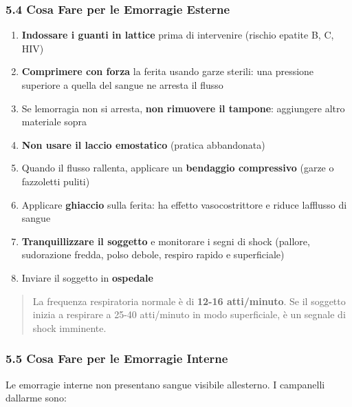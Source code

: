 \documentclass[a4paper,11pt]{article}
\providecommand{\tightlist}{%
  \setlength{\itemsep}{0pt}\setlength{\parskip}{0pt}}
\begin{document}
\subsubsection{5.4 Cosa Fare per le Emorragie
      Esterne}\label{cosa-fare-per-le-emorragie-esterne}

\begin{enumerate}
      \tightlist
      \item
            \textbf{Indossare i guanti in lattice} prima di intervenire (rischio
            epatite B, C, HIV)
      \item
            \textbf{Comprimere con forza} la ferita usando garze sterili: una
            pressione superiore a quella del sangue ne arresta il flusso
      \item
            Se l\textquotesingle emorragia non si arresta, \textbf{non rimuovere
                  il tampone}: aggiungere altro materiale sopra
      \item
            \textbf{Non usare il laccio emostatico} (pratica abbandonata)
      \item
            Quando il flusso rallenta, applicare un \textbf{bendaggio compressivo}
            (garze o fazzoletti puliti)
      \item
            Applicare \textbf{ghiaccio} sulla ferita: ha effetto vasocostrittore e
            riduce l\textquotesingle afflusso di sangue
      \item
            \textbf{Tranquillizzare il soggetto} e monitorare i segni di shock
            (pallore, sudorazione fredda, polso debole, respiro rapido e
            superficiale)
      \item
            Inviare il soggetto in \textbf{ospedale}
\end{enumerate}

\begin{quote}
      La frequenza respiratoria normale è di \textbf{12-16 atti/minuto}. Se il
      soggetto inizia a respirare a 25-40 atti/minuto in modo superficiale, è
      un segnale di shock imminente.
\end{quote}

\subsubsection{5.5 Cosa Fare per le Emorragie
      Interne}\label{cosa-fare-per-le-emorragie-interne}

Le emorragie interne non presentano sangue visibile
all\textquotesingle esterno. I campanelli d\textquotesingle allarme
sono:
\end{document}
